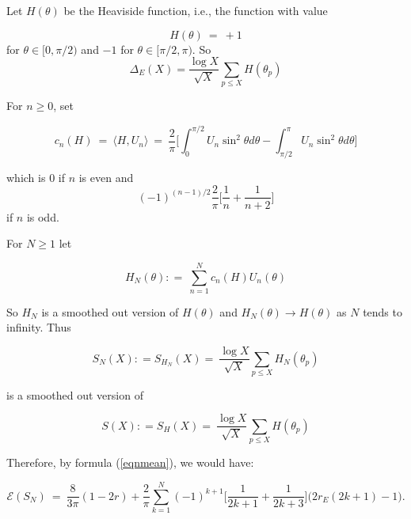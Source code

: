 \documentclass[11pt]{article}
\theoremstyle{plain}
\theoremstyle{definition}
\numberwithin{equation}{section}
\numberwithin{figure}{section}
\numberwithin{table}{section}
\begin{document}
Let $H(\theta)$ be the Heaviside function, i.e., the function with value

\begin{equation}
H(\theta) \ = \ +1
\end{equation}
 for $\theta \in [0, \pi/2)$ and  $-1$ for $\theta \in [\pi/2, \pi)$.  So
\begin{equation}
\Delta_E(X) = {\frac{\log X}{\sqrt X}}\sum_{p\le X} H(\theta_p)
\end{equation}


For $n \ge 0$, set


\begin{equation}
c_n(H)  \ = \ \langle H, U_n\rangle \ = \ {\frac{2}{\pi}}\big[\int_0^{\pi/2}U_n\sin^2\theta d \theta - \int_{\pi/2}^{\pi}U_n\sin^2\theta d \theta \big]
\end{equation}


which is $0$ if $n$ is even and $$(-1)^{(n-1)/2}{\frac{2}{\pi}}\big[{\frac{1}{n}} + {\frac{1}{n+2}}\big]$$ if $n$ is odd.



For $N \ge 1$ let

\begin{equation}
H_N(\theta): = \ \sum_{n=1}^Nc_n(H)U_n(\theta)
\end{equation}


So $H_N$ is a smoothed out version of $H(\theta)$ and $H_N(\theta) \to H(\theta)$ as $N $ tends to infinity.  Thus

\begin{equation}
S_N(X): = S_{H_N}(X) = \ {\frac{\log X}{{\sqrt{X}}}}\sum_{p \le X}H_N(\theta_p)
\end{equation}


is a smoothed out version of

\begin{equation}\label{smooth}
S(X): = S_{H}(X) = \ {\frac{\log X}{{\sqrt{X}}}}\sum_{p \le X}H(\theta_p)
\end{equation}

Therefore, by formula (\ref{eqnmean}), we would have:

\begin{equation}\label{early}
{\mathcal E}(S_N)\ = \ {\frac{8}{3\pi}}(1-2r) + {\frac{2}{\pi}} \sum_{k=1}^{N}  (-1)^{k+1}\big[{\frac{1}{2k+1}} + {\frac{1}{2k+3}}\big]\big(2r_E(2k+1)-1\big).
\end{equation}
\end{document}
